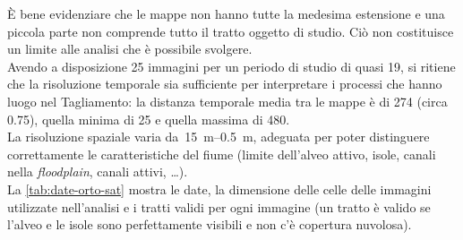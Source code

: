 È bene evidenziare che le mappe non hanno tutte la medesima estensione e una piccola parte non comprende tutto il tratto oggetto di studio.
Ciò non costituisce un limite alle analisi che è possibile svolgere.
\\
Avendo a disposizione 25 immagini per un periodo di studio di quasi \SI{19}{\anni},  si ritiene che la risoluzione temporale sia sufficiente per interpretare i processi che hanno luogo nel Tagliamento: la distanza temporale media tra le mappe è di \SI{274}{\giorni} (circa \SI{0.75}{\anni}), quella minima di \SI{25}{\giorni} e quella massima di \SI{480}{\giorni}.
\\
La risoluzione spaziale varia da~\SIrange[range-phrase={ a }]{15}{0.5}{\m}, adeguata per poter distinguere correttamente le caratteristiche del fiume (limite dell'alveo attivo, isole, canali nella \emph{floodplain}, canali attivi, \ldots).
\\
La \cref{tab:date-orto-sat} mostra le date, la dimensione delle celle delle immagini utilizzate nell'analisi e i tratti validi per ogni immagine (un tratto è valido se l'alveo e le isole sono perfettamente visibili e non c'è copertura nuvolosa).
